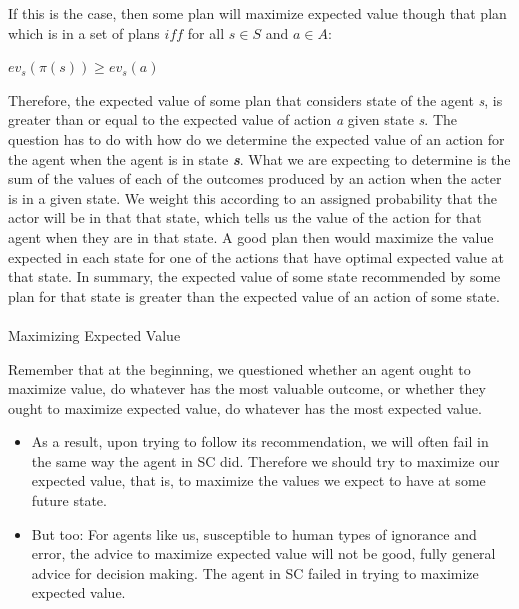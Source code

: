 \documentclass[
  letterpaper,
  DIV=11,
  numbers=noendperiod]{scrartcl}
\makeatletter
\let\oldparagraph\paragraph
\renewcommand{\paragraph}{
    \@ifstar
      \xxxParagraphStar
      \xxxParagraphNoStar
  }
\newcommand{\xxxParagraphStar}[1]{\oldparagraph*{#1}\mbox{}}
\newcommand{\xxxParagraphNoStar}[1]{\oldparagraph{#1}\mbox{}}
\providecommand{\tightlist}{%
  \setlength{\itemsep}{0pt}\setlength{\parskip}{0pt}}
\makeatother
\begin{document}
If this is the case, then some plan will maximize expected value though
that plan which is in a set of plans \(iff\) for all \(s \in S\) and
\(a \in A:\)

\(ev_s(\pi(s)) \geq ev_s(a)\)

Therefore, the expected value of some plan that considers state of the
agent \emph{s}, is greater than or equal to the expected value of action
\emph{a} given state \emph{s}. The question has to do with how do we
determine the expected value of an action for the agent when the agent
is in state \emph{\textbf{s}}. What we are expecting to determine is the
sum of the values of each of the outcomes produced by an action when the
acter is in a given state. We weight this according to an assigned
probability that the actor will be in that that state, which tells us
the value of the action for that agent when they are in that state. A
good plan then would maximize the value expected in each state for one
of the actions that have optimal expected value at that state. In
summary, the expected value of some state recommended by some plan for
that state is greater than the expected value of an action of some
state.

\paragraph{Maximizing Expected Value}\label{maximizing-expected-value}

Remember that at the beginning, we questioned whether an agent ought to
maximize value, do whatever has the most valuable outcome, or whether
they ought to maximize expected value, do whatever has the most expected
value.

\begin{itemize}
\tightlist
\item
  As a result, upon trying to follow its recommendation, we will often
  fail in the same way the agent in SC did. Therefore we should try to
  maximize our expected value, that is, to maximize the values we expect
  to have at some future state.
\item
  But too: For agents like us, susceptible to human types of ignorance
  and error, the advice to maximize expected value will not be good,
  fully general advice for decision making. The agent in SC failed in
  trying to maximize expected value.
\end{itemize}
\end{document}

